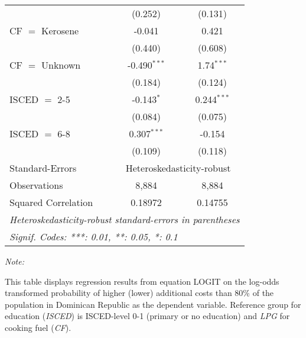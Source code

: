 \begin{table}[htbp!]
\begin{adjustbox}{width = 1\textwidth, max height = 0.95\textheight, center}
\begin{threeparttable}[b]
\begin{tabular}{lcc}
                                 & (0.252)        & (0.131)\\   
            CF $=$ Kerosene      & -0.041         & 0.421\\   
                                 & (0.440)        & (0.608)\\   
            CF $=$ Unknown       & -0.490$^{***}$ & 1.74$^{***}$\\   
                                 & (0.184)        & (0.124)\\   
            ISCED $=$ 2-5        & -0.143$^{*}$   & 0.244$^{***}$\\   
                                 & (0.084)        & (0.075)\\   
            ISCED $=$ 6-8        & 0.307$^{***}$  & -0.154\\   
                                 & (0.109)        & (0.118)\\   
            \midrule 
            Standard-Errors & \multicolumn{2}{c}{Heteroskedasticity-robust} \\ 
            Observations         & 8,884          & 8,884\\  
            Squared Correlation  & 0.18972        & 0.14755\\  
            \midrule \midrule
            \multicolumn{3}{l}{\emph{Heteroskedasticity-robust standard-errors in parentheses}}\\
            \multicolumn{3}{l}{\emph{Signif. Codes: ***: 0.01, **: 0.05, *: 0.1}}\\
         \end{tabular}
         
         \begin{tablenotes}\item \medskip \textit{Note:}
            \item This table displays regression results from equation LOGIT on the log-odds transformed probability of higher (lower) additional costs than 80\% of the population in Dominican Republic as the dependent variable. Reference group for education (\textit{ISCED}) is ISCED-level 0-1 (primary or no education) and \textit{LPG} for cooking fuel (\textit{CF}).
         \end{tablenotes}
      \end{threeparttable}
   \end{adjustbox}
\end{table}


